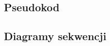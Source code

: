 \documentclass[10pt,a4paper]{article}
\begin{document}
\subsection{Pseudokod}

\subsection{Diagramy sekwencji}
%
\end{document}
